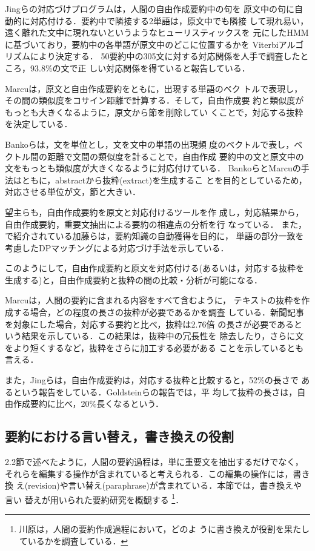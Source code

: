 Jingら\cite{jing:99:a}の対応づけプログラムは，人間の自由作成要約中の句を
原文中の句に自動的に対応付ける．要約中で隣接する2単語は，原文中でも隣接
して現れ易い，遠く離れた文中に現れないというようなヒューリスティックスを
元にしたHMMに基づいており，要約中の各単語が原文中のどこに位置するかを
Viterbiアルゴリズムにより決定する．
50要約中の305文に対する対応関係を人手で調査したところ，93.8\%の文で正
しい対応関係を得ていると報告している．

Marcu\cite{marcu:99:a}は，原文と自由作成要約をともに，出現する単語のベク
トルで表現し，その間の類似度をコサイン距離で計算する．そして，自由作成要
約と類似度がもっとも大きくなるように，原文から節を削除してい
くことで，対応する抜粋を決定している．

Bankoら\cite{banko:99:a}は，文を単位とし，文を文中の単語の出現頻
度のベクトルで表し，ベクトル間の距離で文間の類似度を計ることで，自由作成
要約中の文と原文中の文をもっとも類似度が大きくなるように対応付けている．
BankoらとMarcuの手法はともに，abstractから抜粋(extract)を生成するこ
とを目的としているため，対応させる単位が文，節と大きい．

望主ら\cite{mochinushi:00:a}も，自由作成要約を原文と対応付けるツールを作
成し，対応結果から，自由作成要約，重要文抽出による要約の相違点の分析を行
なっている．
また，\cite{okumura:99:a}で紹介されている加藤らは，要約知識の自動獲得を目的に，
単語の部分一致を考慮したDPマッチングによる対応づけ手法を示している．

このようにして，自由作成要約と原文を対応付ける(あるいは，対応する抜粋を
生成する)と，自由作成要約と抜粋の間の比較・分析が可能になる．

Marcu\cite{marcu:99:a}は，人間の要約に含まれる内容をすべて含むように，
テキストの抜粋を作成する場合，どの程度の長さの抜粋が必要であるかを調査
している．新聞記事を対象にした場合，対応する要約と比べ，抜粋は2.76倍
の長さが必要であるという結果を示している．この結果は，抜粋中の冗長性を
除去したり，さらに文をより短くするなど，抜粋をさらに加工する必要がある
ことを示しているとも言える．

また，Jingらは，自由作成要約は，対応する抜粋と比較すると，52\%の長さで
あるという報告をしている．Goldsteinら\cite{goldstein:99:b}の報告では，平
均して抜粋の長さは，自由作成要約に比べ，20\%長くなるという．

\subsection{要約における言い替え，書き換えの役割}

2.2節で述べたように，人間の要約過程は，単に重要文を抽出するだけでなく，
それらを編集する操作が含まれていると考えられる．この編集の操作には，書き換
え(revision)や言い替え(paraphrase)が含まれている．本節では，書き換えや言い
替えが用いられた要約研究を概観する
\footnote{川原\cite{kawahara:89:a}は，人間の要約作成過程において，どのよ
うに書き換えが役割を果たしているかを調査している．}．

